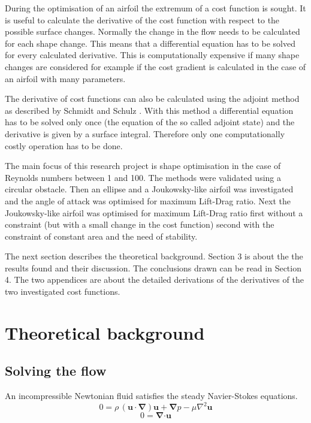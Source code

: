 \documentclass[12pt, a4paper]{article}
\begin{document}
        During the optimisation of an airfoil the extremum of a cost function is sought. It is useful to calculate the derivative of the cost function with respect to the possible surface changes. Normally the change in the flow needs to be calculated for each shape change. This means that a differential equation has to be solved for every calculated derivative. This is computationally expensive if many shape changes are considered for example if the cost gradient is calculated in the case of an airfoil with many parameters.
        
        The derivative of cost functions can also be calculated using the adjoint method as described by Schmidt and Schulz \cite{Schmidt_1}. With this method a differential equation has to be solved only once (the equation of the so called adjoint state) and the derivative is given by a surface integral. Therefore only one computationally costly operation has to be done.
        
        The main focus of this research project is shape optimisation in the case of Reynolds numbers between 1 and 100. The methods were validated using a circular obstacle. Then an ellipse and a Joukowsky-like airfoil was investigated and the angle of attack was optimised for maximum Lift-Drag ratio. Next the Joukowsky-like airfoil was optimised for maximum Lift-Drag ratio first without a constraint (but with a small change in the cost function) second with the constraint of constant area and the need of stability.
        
        The next section describes the theoretical background. Section 3 is about the the results found and their discussion. The conclusions drawn can be read in Section 4. The two appendices are about the detailed derivations of the derivatives of the two investigated cost functions.
        
\section{Theoretical background}
    \subsection{Solving the flow}
    An incompressible Newtonian fluid satisfies the steady Navier-Stokes equations.
    \begin{equation} \label{NS_1}
    0 = \rho \, (\mathbf{u \cdot} \boldsymbol{\nabla}) \mathbf{u} + \boldsymbol{\nabla} p - 
    \mu \nabla^2 \mathbf{u}
    \end{equation}
    \begin{equation} \label{NS_2}
    0 = \boldsymbol{\nabla} \mathbf{\cdot u}
    \end{equation}
    
\end{document}

